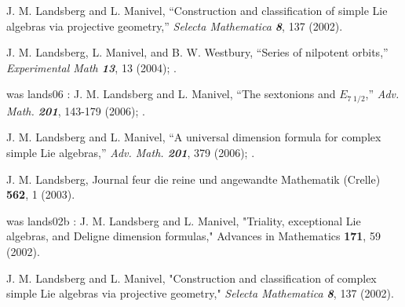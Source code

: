 %
%

 J. M. Landsberg and L. Manivel,
    {``Construction and classification of
    simple Lie algebras via projective geometry,''}
    {\em Selecta Mathematica  \bf 8}, 137 (2002). %

 J. M. Landsberg, L. Manivel, and B. W. Westbury,
    {``Series of nilpotent orbits,''}
    {\em Experimental Math \bf 13}, 13 (2004); %
        .

was lands06 :
 J. M. Landsberg and L. Manivel,
        ``The sextonions and $E_{7\; 1/2}$,''
        {\em Adv.  Math. \bf 201}, 143-179 (2006); %
        .

 J. M. Landsberg and L. Manivel,
        {``A universal dimension
        formula for complex simple Lie algebras,''}
        {\em Adv.  Math. \bf 201}, 379 (2006); %
        .

 J. M. Landsberg,
Journal feur die reine und angewandte Mathematik (Crelle) {\bf 562}, 1 (2003). %

was lands02b :
 J. M. Landsberg and L. Manivel,
    "Triality, exceptional Lie algebras, and Deligne dimension formulas,"
    Advances in Mathematics {\bf171}, 59 (2002). %

 J. M. Landsberg and L. Manivel,
    "Construction and classification of complex simple
    Lie algebras via projective geometry,"
    {\em Selecta Mathematica \bf 8}, 137 (2002). %


